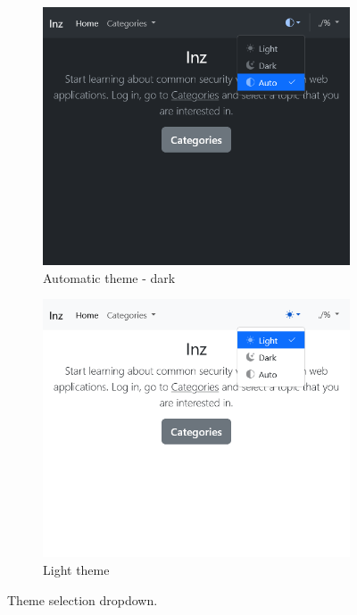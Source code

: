 \begin{figure}
    \centering
    \begin{subfigure}{0.48\textwidth}
        \includegraphics[width=\textwidth]{img/manual-theme-auto.png}
        \caption{Automatic theme - dark}
        \label{fig:manual-theme-auto}
    \end{subfigure}
    \hfill
    \begin{subfigure}{0.48\textwidth}
        \includegraphics[width=\textwidth]{img/manual-theme-light.png}
        \caption{Light theme}
        \label{fig:manual-theme-light}
    \end{subfigure}
    \caption{Theme selection dropdown.}
    \label{fig:manual-theme}
\end{figure}

